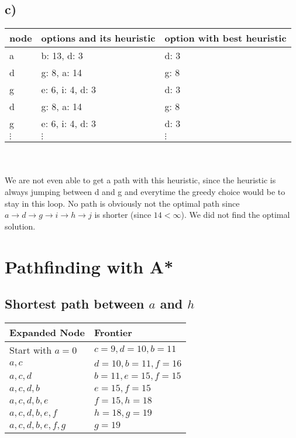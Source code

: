 \documentclass[12pt,a4paper]{scrartcl}
\begin{document}
\subsection*{c)}
	\begin{tabular}{l | l | l   }
		node & options and its heuristic & option with best heuristic \\ \hline
		a & b: 13, d: 3 & d: 3 \\
		d & g: 8, a: 14 & g: 8 \\
		g & e: 6, i: 4, d: 3 & d: 3 \\
		d & g: 8, a: 14 & g: 8 \\
		g & e: 6, i: 4, d: 3 & d: 3 \\
		$\vdots$ & $\vdots$ & $\vdots$ \\
	\end{tabular}\\ \\
	We are not even able to get a path with this heuristic, since the heuristic is always jumping between d and g and everytime the greedy choice would be to stay in this loop. 
	No path is obviously not the optimal path since $a \rightarrow d \rightarrow g \rightarrow i \rightarrow h \rightarrow j$ is shorter (since $14 < \infty$). We did not find the optimal solution.
\section{Pathfinding with A*}
\subsection*{Shortest path between $a$ and $h$}
\begin{table}[h]
	\centering
	\begin{tabular}{l|l}
		Expanded Node    & Frontier           \\ \hline
		Start with $a=0$ & $c=9, d=10, b=11$  \\
		$a,c$            & $d=10, b=11,f=16$  \\
		$a,c,d$          & $b=11, e=15, f=15$ \\
		$a,c,d,b$        & $e=15, f=15$       \\
		$a,c,d,b,e$      & $f=15, h=18$       \\
		$a,c,d,b,e,f$    & $h=18, g=19$       \\
		$a,c,d,b,e,f,g$  & $g=19$            
	\end{tabular}
\end{table}
\end{document}
